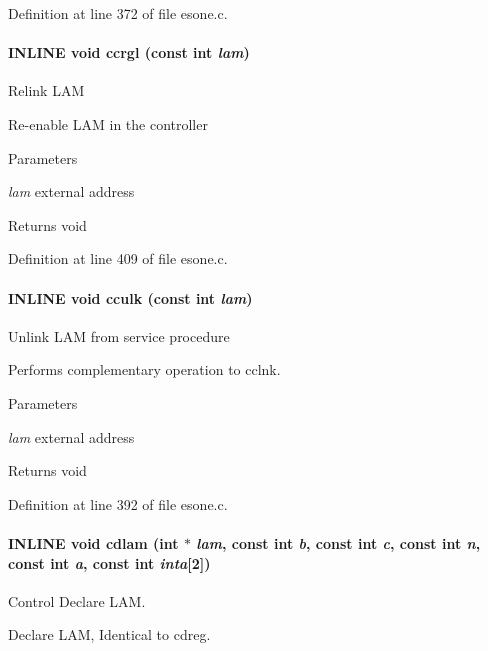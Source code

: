 Definition at line 372 of file esone.c.
\paragraph[{ccrgl}]{\setlength{\rightskip}{0pt plus 5cm}INLINE void ccrgl (const int {\em lam})}\hfill\label{esone_8c_a78cd4b969a357516903d9bf6698f7121}
Relink LAM

Re-\/enable LAM in the controller


\begin{DoxyParams}{Parameters}
\item[{\em lam}]external address \end{DoxyParams}
\begin{DoxyReturn}{Returns}
void 
\end{DoxyReturn}


Definition at line 409 of file esone.c.
\paragraph[{cculk}]{\setlength{\rightskip}{0pt plus 5cm}INLINE void cculk (const int {\em lam})}\hfill\label{esone_8c_abd1bbcd4374fecb644cc6269671e5b06}
Unlink LAM from service procedure

Performs complementary operation to cclnk.


\begin{DoxyParams}{Parameters}
\item[{\em lam}]external address \end{DoxyParams}
\begin{DoxyReturn}{Returns}
void 
\end{DoxyReturn}


Definition at line 392 of file esone.c.
\paragraph[{cdlam}]{\setlength{\rightskip}{0pt plus 5cm}INLINE void cdlam (int $\ast$ {\em lam}, \/  const int {\em b}, \/  const int {\em c}, \/  const int {\em n}, \/  const int {\em a}, \/  const int {\em inta}\mbox{[}2\mbox{]})}\hfill\label{esone_8c_a33de03691bbe1f60fcf1ed57f543a967}
Control Declare LAM.

Declare LAM, Identical to cdreg.


